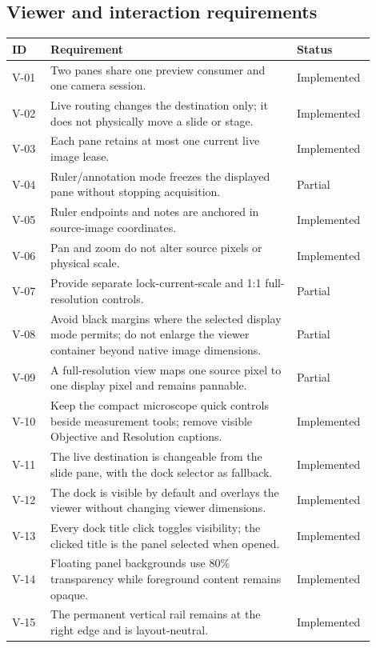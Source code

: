\documentclass[11pt,a4paper,oneside]{article}
\newcommand{\implemented}{\textsf{Implemented}}
\newcommand{\partialstatus}{\textsf{Partial}}
\begin{document}
\subsection{Viewer and interaction requirements}
\begin{longtable}{p{0.10\linewidth}p{0.64\linewidth}p{0.16\linewidth}}
\toprule
ID & Requirement & Status\\
\midrule
V-01 & Two panes share one preview consumer and one camera session. & \implemented\\
V-02 & Live routing changes the destination only; it does not physically move a slide or stage. & \implemented\\
V-03 & Each pane retains at most one current live image lease. & \implemented\\
V-04 & Ruler/annotation mode freezes the displayed pane without stopping acquisition. & \partialstatus\\
V-05 & Ruler endpoints and notes are anchored in source-image coordinates. & \implemented\\
V-06 & Pan and zoom do not alter source pixels or physical scale. & \implemented\\
V-07 & Provide separate lock-current-scale and 1:1 full-resolution controls. & \partialstatus\\
V-08 & Avoid black margins where the selected display mode permits; do not enlarge the viewer container beyond native image dimensions. & \partialstatus\\
V-09 & A full-resolution view maps one source pixel to one display pixel and remains pannable. & \partialstatus\\
V-10 & Keep the compact microscope quick controls beside measurement tools; remove visible Objective and Resolution captions. & \implemented\\
V-11 & The live destination is changeable from the slide pane, with the dock selector as fallback. & \implemented\\
V-12 & The dock is visible by default and overlays the viewer without changing viewer dimensions. & \implemented\\
V-13 & Every dock title click toggles visibility; the clicked title is the panel selected when opened. & \implemented\\
V-14 & Floating panel backgrounds use 80\% transparency while foreground content remains opaque. & \implemented\\
V-15 & The permanent vertical rail remains at the right edge and is layout-neutral. & \implemented\\
\bottomrule
\end{longtable}
\end{document}
